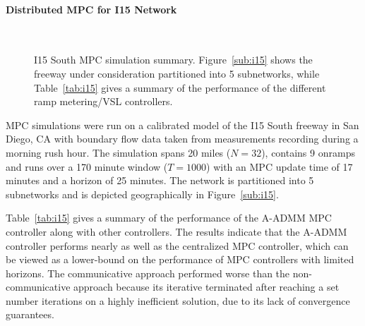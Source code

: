 \paragraph{Distributed MPC for I15 Network}

\begin{figure}[ht]
  \centering
   \\
    \caption[I15 South MPC simulation summary for distributed A-ADMM controller.]{I15 South MPC simulation summary. Figure~\ref{sub:i15} shows the freeway under consideration partitioned into 5 subnetworks, while Table~\ref{tab:i15} gives a summary of the performance of the different ramp metering/VSL controllers.}
    \label{fig:i15-admm}
\end{figure}

MPC simulations were run on a calibrated model of the I15 South freeway in San Diego, CA with boundary flow data taken from measurements recording during a morning rush hour. The simulation spans 20 miles ($N=32$), contains 9 onramps and runs over a 170 minute window ($T=1000$) with an MPC update time of 17 minutes and a horizon of 25 minutes. The network is partitioned into 5 subnetworks and is depicted geographically in Figure~\ref{sub:i15}.

Table~\ref{tab:i15} gives a summary of the performance of the A-ADMM MPC controller along with other controllers. The results indicate that the A-ADMM controller performs nearly as well as the centralized MPC controller, which can be viewed as a lower-bound on the performance of MPC controllers with limited horizons. The communicative approach performed worse than the non-communicative approach because its iterative terminated after reaching a set number iterations on a highly inefficient solution, due to its lack of convergence guarantees.
